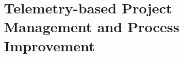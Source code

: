 	

%
%
%
%
%
%
%














\section{Telemetry-based Project Management and Process Improvement} 
\label{Telemetry:Process}


